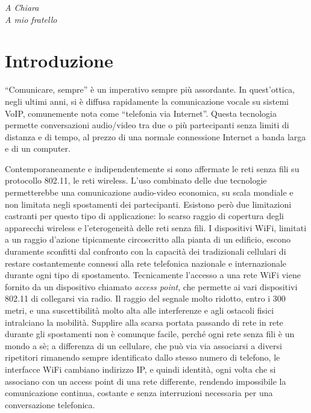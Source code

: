 \documentclass[12pt,a4paper,openright,twoside]{book}
\begin{document}
%
%
\begin{titlepage}
  \thispagestyle{empty}
  \topmargin=6.5cm
  \raggedleft
  \large
  \em A Chiara\\
  A mio fratello
\end{titlepage}


\chapter*{Introduzione}

``Comunicare, sempre'' è un imperativo sempre più assordante. In
quest'ottica, negli ultimi anni, si è diffusa rapidamente la
comunicazione vocale su sistemi VoIP, comunemente nota come
``telefonia via Internet''. Questa tecnologia permette conversazioni
audio/video tra due o più partecipanti senza limiti di distanza e di
tempo, al prezzo di una normale connessione Internet a banda larga e
di un computer.

Contemporaneamente e indipendentemente si sono affermate le reti senza
fili su protocollo 802.11, le reti wireless. L'uso combinato delle due
tecnologie permetterebbe una comunicazione audio-video economica, su
scala mondiale e non limitata negli spostamenti dei
partecipanti. Esistono però due limitazioni castranti per questo tipo
di applicazione: lo scarso raggio di copertura degli apparecchi
wireless e l'eterogeneità delle reti senza fili. I dispositivi WiFi,
limitati a un raggio d'azione tipicamente circoscritto alla pianta di
un edificio, escono duramente sconfitti dal confronto con la capacità
dei tradizionali cellulari di restare costantemente connessi alla rete
telefonica nazionale e internazionale durante ogni tipo di
spostamento. Tecnicamente l'accesso a una rete WiFi viene fornito da
un dispositivo chiamato \emph{access point}, che permette ai vari
dispositivi 802.11 di collegarsi via radio. Il raggio del segnale
molto ridotto, entro i 300 metri, e una suscettibilità molto alta alle
interferenze e agli ostacoli fisici intralciano la mobilità. Supplire
alla scarsa portata passando di rete in rete durante gli spostamenti
non è comunque facile, perché ogni rete senza fili è un mondo a sè; a
differenza di un cellulare, che può via via associarsi a diversi
ripetitori rimanendo sempre identificato dallo stesso numero di
telefono, le interfacce WiFi cambiano indirizzo IP, e quindi identità,
ogni volta che si associano con un access point di una rete
differente, rendendo impossibile la comunicazione continua, costante e
senza interruzioni necessaria per una conversazione telefonica.
\end{document}
